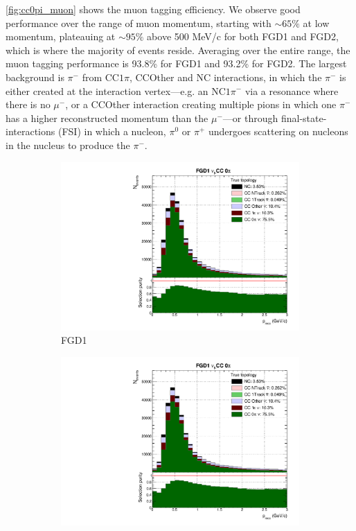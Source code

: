 \autoref{fig:cc0pi_muon} shows the muon tagging efficiency. We observe good performance over the range of muon momentum, starting with $\sim65\%$ at low momentum, plateauing at $\sim95\%$ above 500 MeV/c for both FGD1 and FGD2, which is where the majority of events reside. Averaging over the entire range, the muon tagging performance is 93.8\% for FGD1 and 93.2\% for FGD2. The largest background is $\pi^-$ from CC$1\pi$, CCOther and NC interactions, in which the $\pi^-$ is either created at the interaction vertex---e.g. an NC$1\pi^-$ via a resonance where there is no $\mu^-$, or a CCOther interaction creating multiple pions in which one $\pi^-$ has a higher reconstructed momentum than the $\mu^-$---or through final-state-interactions (FSI) in which a nucleon, $\pi^0$ or $\pi^+$ undergoes scattering on nucleons in the nucleus to produce the $\pi^-$.
\begin{figure}[h]
	\begin{subfigure}[t]{0.49\textwidth}
		\includegraphics[width=\textwidth,page=2, trim={0mm 0mm 0mm 9mm}, clip]{figures/mach3/selection/2017b_Diag_WithSelection}
		\caption{FGD1}
	\end{subfigure}
	\begin{subfigure}[t]{0.49\textwidth}
		\includegraphics[width=\textwidth,page=8, trim={0mm 0mm 0mm 9mm}, clip]{figures/mach3/selection/2017b_Diag_WithSelection}

\end{subfigure}
\end{figure}
